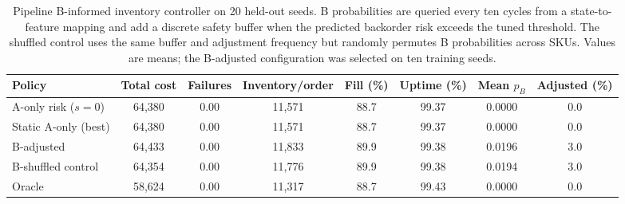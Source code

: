 \begin{table}[H]
\centering
\caption{Pipeline B-informed inventory controller on 20 held-out seeds. B probabilities are queried every ten cycles from a state-to-feature mapping and add a discrete safety buffer when the predicted backorder risk exceeds the tuned threshold. The shuffled control uses the same buffer and adjustment frequency but randomly permutes B probabilities across SKUs. Values are means; the B-adjusted configuration was selected on ten training seeds.}
\label{tab:sim-b}
\footnotesize
\setlength{\tabcolsep}{3pt}
\begin{tabular}{lccccccc}
\toprule
Policy & Total cost & Failures & Inventory/order & Fill (\%) & Uptime (\%) & Mean $p_B$ & Adjusted (\%) \\
\midrule
A-only risk ($s=0$) & 64,380 & 0.00 & 11,571 & 88.7 & 99.37 & 0.0000 & 0.0 \\
Static A-only (best) & 64,380 & 0.00 & 11,571 & 88.7 & 99.37 & 0.0000 & 0.0 \\
B-adjusted & 64,433 & 0.00 & 11,833 & 89.9 & 99.38 & 0.0196 & 3.0 \\
B-shuffled control & 64,354 & 0.00 & 11,776 & 89.9 & 99.38 & 0.0194 & 3.0 \\
Oracle & 58,624 & 0.00 & 11,317 & 88.7 & 99.43 & 0.0000 & 0.0 \\
\bottomrule
\end{tabular}
\end{table}

